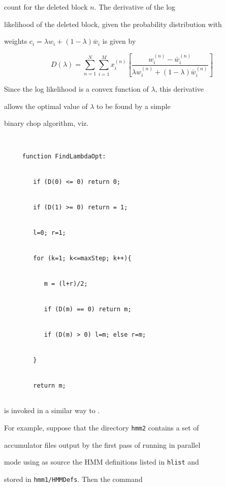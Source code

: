 count for the deleted block $n$.  The derivative of the log


likelihood of the deleted block, given the probability distribution with


weights $c_i = \lambda w_i + (1 - \lambda) \bar{w}_i$ is given by


\begin{equation}


  D(\lambda) = \sum_{n=1}^N \sum_{i=1}^M x_i^{(n)}


   \left[ \frac{w_i^{(n)} - \bar{w}_i^{(n)}}{


            \lambda w_i^{(n)} + (1 - \lambda ) \bar{w}_i^{(n)}} 


   \right]


\end{equation}


Since the log likelihood is a convex function of $\lambda$, this derivative


allows the optimal value of $\lambda$ to be found by a simple


binary chop algorithm, viz.


\begin{verbatim}


     function FindLambdaOpt:


        if (D(0) <= 0) return 0;


        if (D(1) >= 0) return = 1;


        l=0; r=1;


        for (k=1; k<=maxStep; k++){


           m = (l+r)/2;


           if (D(m) == 0) return m;


           if (D(m) > 0) l=m; else r=m;


        }


        return m;


\end{verbatim}





 is invoked in a similar way to .


For example, suppose that the directory \texttt{hmm2} contains a set of


accumulator files output by the first pass of  running in parallel


mode using as source the HMM definitions listed in \texttt{hlist} and 


stored in \texttt{hmm1/HMMDefs}.  Then the command


